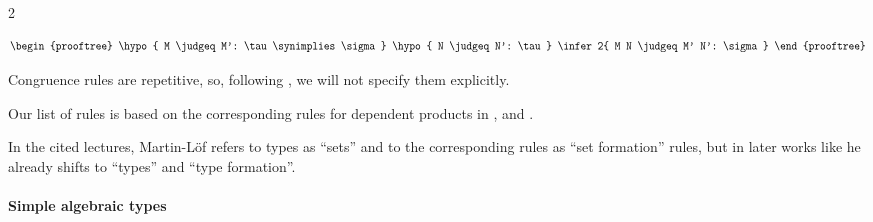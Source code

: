 \begin{remark}
\begin{thmenum}
\begin{thmenum}
\begin{paracol}{2}
        \begin{rightcolumn}
          \ParacolAlignmentHack
          \begin{equation*}
            \begin{prooftree}
              \hypo{ M \judgeq M': \tau \synimplies \sigma }
              \hypo{ N \judgeq N': \tau }
              \infer2{ M N \judgeq M' N': \sigma }
            \end{prooftree}
          \end{equation*}
        \end{rightcolumn}
      \end{paracol}
      \columnratio{}

      Congruence rules are repetitive, so, following \cite[\S A.2]{UnivalentFoundationsProgram2013HoTT}, we will not specify them explicitly.
    \end{thmenum}
  \end{thmenum}
\end{remark}
\begin{comments}
  \item Our list of rules is based on the corresponding rules for dependent products in \cite{MartinLöf1984IntuitionisticTypeTheory}, \cite[\S A.2.4]{UnivalentFoundationsProgram2013HoTT} and \cite[\S 8.1.10]{Mimram2020ProgramEqualsProof}.

  \item In the cited lectures, Martin-L\"of refers to types as \enquote{sets} and to the corresponding rules as \enquote{set formation} rules, but in later works like \cite{MartinLöf1994TypeJudgments} he already shifts to \enquote{types} and \enquote{type formation}.
\end{comments}

\paragraph{Simple algebraic types}

